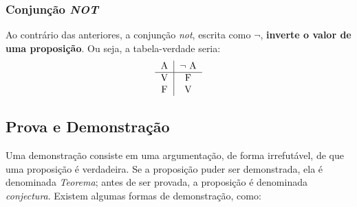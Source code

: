 \documentclass{article}
\begin{document}
\subsubsection{Conjunção \emph{NOT}}
Ao contrário das anteriores, a conjunção \emph{not}, escrita como $\lnot$, \textbf{inverte o valor de uma proposição}. Ou seja, a tabela-verdade seria:
\begin{align*}
    \begin{tabular}{c|c}
        A & $\lnot$ A  \\
        \hline
        V & F \\
        F & V \\
    \end{tabular}
\end{align*}

\subsection{Prova e Demonstração}
Uma demonstração consiste em uma argumentação, de forma irrefutável, de que uma proposição é verdadeira. Se a proposição puder ser demonstrada, ela é denominada \emph{Teorema}; antes de ser provada, a proposição é denominada \emph{conjectura}.
Existem algumas formas de demonstração, como:
\end{document}
